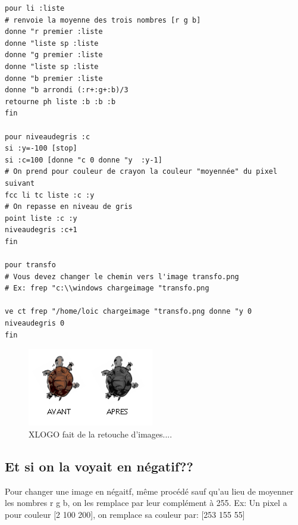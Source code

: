 \pagebreak
\begin{verbatim}
pour li :liste
# renvoie la moyenne des trois nombres [r g b]
donne "r premier :liste
donne "liste sp :liste
donne "g premier :liste
donne "liste sp :liste
donne "b premier :liste
donne "b arrondi (:r+:g+:b)/3
retourne ph liste :b :b :b
fin

pour niveaudegris :c
si :y=-100 [stop]
si :c=100 [donne "c 0 donne "y  :y-1]
# On prend pour couleur de crayon la couleur "moyennée" du pixel suivant
fcc li tc liste :c :y
# On repasse en niveau de gris
point liste :c :y
niveaudegris :c+1
fin

pour transfo
# Vous devez changer le chemin vers l'image transfo.png 
# Ex: frep "c:\\windows chargeimage "transfo.png 

ve ct frep "/home/loic chargeimage "transfo.png donne "y 0 niveaudegris 0
fin

\end{verbatim} 
\begin{figure}[h]
\includegraphics{images/transfo.png}
\caption{XLOGO fait de la retouche d'images....}
\end{figure}

\subsection{Et si on la voyait en négatif??}
Pour changer une image en négaitf, même procédé sauf qu'au lieu de moyenner les nombres r g b, on les remplace par leur complément à 255. Ex: Un pixel a pour couleur [2 100 200], on remplace sa couleur par: [253 155 55]

